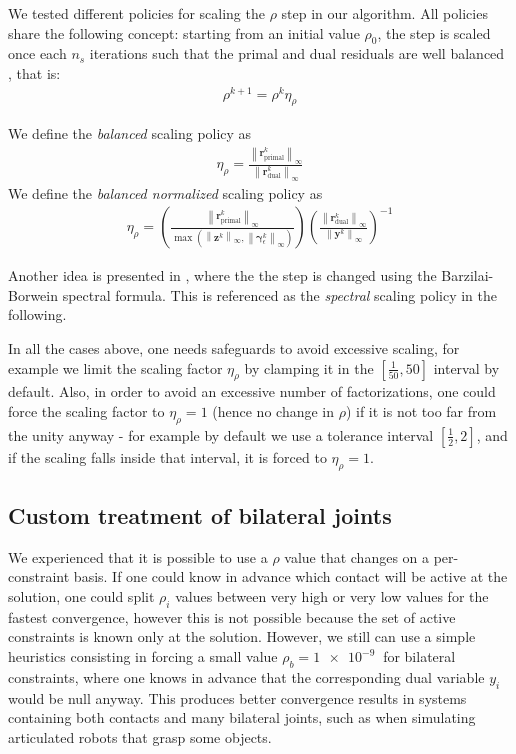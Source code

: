 \documentclass[AMA,STIX1COL]{WileyNJD-v2}
\newcommand{\vect}[1]{\bm{#1}}
\newcommand{\norm}[1]{\left\lVert#1\right\rVert}
\begin{document}
We tested different policies for scaling the $\rho$ step in our algorithm. 
All policies share the following concept: starting from an initial value $\rho_0$, the step is scaled once each $n_s$ iterations such that the primal and dual residuals are well balanced 
\cite{Wohlberg2017}, %
that is:
\begin{align}
	\rho^{k+1} = \rho^{k} \eta_\rho 
\end{align}
  
We define the \textit{balanced} scaling policy as
\begin{align}
	\eta_\rho = \frac{ \norm{\vect{r}_{\text{primal}}^{k}}_\infty }{ \norm{\vect{r}_{\text{dual}}^{k}}_\infty }  
\end{align}
We define the \textit{balanced normalized} scaling policy as
\begin{align}
	\eta_\rho = \left( \frac{\norm{\vect{r}_{\text{primal}}^{k}}_\infty}{ \max{ \left( \norm{\vect{z}^k}_\infty,\norm{\vect{\gamma}_\epsilon^k}_\infty \right) } } \right)
															\left( \frac{\norm{\vect{r}_{\text{dual}}^{k}}_\infty}  { \norm{\vect{y}^k }_\infty }  \right)^{-1}
\end{align}

Another idea is presented in 
 \cite{Xu_adaptive_2017}, %
where the the step is changed using the Barzilai-Borwein spectral formula. This is referenced as the \textit{spectral} scaling policy in the following.

In all the cases above, one needs safeguards to avoid excessive scaling, for example we limit the scaling factor $\eta_\rho$ by clamping it in the $\left[\frac{1}{50}, 50 \right]$ interval by default. Also, in order to avoid an excessive number of factorizations, one could force the scaling factor to $\eta_\rho=1$ (hence no change in $\rho$) if it is not too far from the unity anyway - for example by default we use a tolerance interval $\left[\frac{1}{2}, 2 \right]$, and if the scaling falls inside that interval, it is forced to $\eta_\rho=1$.


\subsection{Custom treatment of bilateral joints}

We experienced that it is possible to use a $\rho$ value that changes on a per-constraint basis. If one could know in advance which contact will be active at the solution, one could split $\rho_i$ values between very high or very low values for the fastest convergence, however this is not possible because the set of active constraints is known only at the solution. However, we still can use a
simple heuristics consisting in forcing a small value $\rho_b = \SI{1e-9}{}$ for bilateral constraints, where one knows in advance that the corresponding dual variable $y_i$ would be null anyway. This produces better convergence results in systems containing both contacts and many bilateral joints, such as when simulating articulated robots that grasp some objects. 
\end{document}
